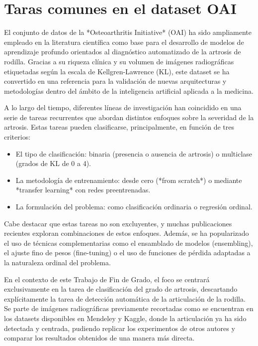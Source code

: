 \documentclass[11pt,spanish,listoffigures,listoftables]{tfgetsinf}
\begin{document}
\section{Taras comunes en el dataset OAI}
\label{sec:common_tasks}

El conjunto de datos de la *Osteoarthritis Initiative* (OAI) ha sido ampliamente empleado en la literatura científica como base para el desarrollo de modelos de aprendizaje
profundo orientados al diagnóstico automatizado de la artrosis de rodilla. Gracias a su riqueza clínica y su volumen de imágenes radiográficas etiquetadas según la escala de
Kellgren-Lawrence (KL), este dataset se ha convertido en una referencia para la validación de nuevas arquitecturas y metodologías dentro del ámbito de la inteligencia 
artificial aplicada a la medicina.

A lo largo del tiempo, diferentes líneas de investigación han coincidido en una serie de tareas recurrentes que abordan distintos enfoques sobre la severidad de la artrosis. 
Estas tareas pueden clasificarse, principalmente, en función de tres criterios:

\begin{itemize}
    \item El tipo de clasificación: binaria (presencia o ausencia de artrosis) o multiclase (grados de KL de 0 a 4).
    \item La metodología de entrenamiento: desde cero (*from scratch*) o mediante *transfer learning* con redes preentrenadas.
    \item La formulación del problema: como clasificación ordinaria o regresión ordinal.
\end{itemize}

Cabe destacar que estas tareas no son excluyentes, y muchas publicaciones recientes exploran combinaciones de estos enfoques. Además, se ha popularizado el uso de técnicas complementarias 
como el ensamblado de modelos (ensembling), el ajuste fino de pesos (fine-tuning) o el uso de funciones de pérdida adaptadas a la naturaleza ordinal del problema.

En el contexto de este Trabajo de Fin de Grado, el foco se centrará exclusivamente en la tarea de clasificación del grado de artrosis, descartando explícitamente la tarea de detección automática de 
la articulación de la rodilla. Se parte de imágenes radiográficas previamente recortadas como se encuentran en los datasets disponibles en Mendeley y Kaggle, donde la articulación ya ha sido
detectada y centrada, pudiendo replicar los experimentos de otros autores y comparar los resultados obtenidos de una manera más directa. 
\end{document}
